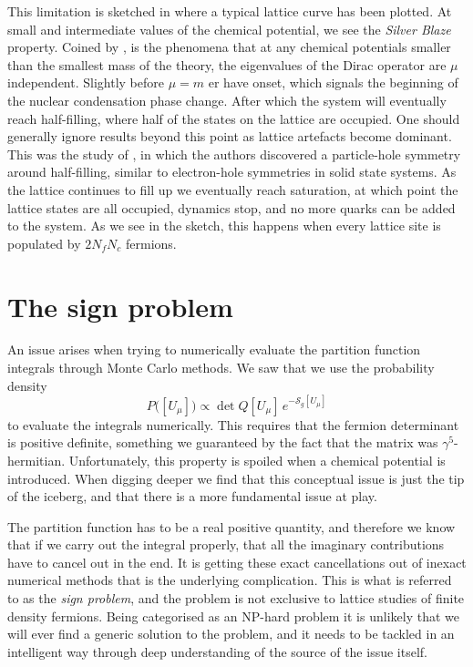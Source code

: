 This limitation is sketched in  where a typical
lattice curve has been plotted. At small and intermediate values of the chemical
potential, we see the \emph{Silver Blaze} property. Coined by
\cite{Cohen:2003kd}, is the phenomena that at any chemical potentials smaller
than the smallest mass of the theory, the eigenvalues of the Dirac operator are
$\mu$ independent. Slightly before $\mu = m$ er have onset, which signals the
beginning of the nuclear condensation phase change. After which the system will
eventually reach half-filling, where half of the states on the lattice are
occupied. One should generally ignore results beyond this point as lattice
artefacts become dominant. This was the study of \citep{Rindlisbacher:2015pea},
in which the authors discovered a particle-hole symmetry around half-filling,
similar to electron-hole symmetries in solid state systems. As the lattice
continues to fill up we eventually reach saturation, at which point the lattice
states are all occupied, dynamics stop, and no more quarks can be added to the
system. As we see in the sketch, this happens when every lattice site is
populated by $2 N_f N_c$ fermions.


\section{The sign problem} \label{sec:sign-problem}

An issue arises when trying to numerically evaluate the partition function
integrals through Monte Carlo methods. We saw that we use the probability
density
%
\begin{equation}
  P\big([U_{\mu}]\big) \propto \det Q [U_{\mu}] \, e^{-\mathcal{S}_g[U_{\mu}]}
\end{equation}
%
to evaluate the integrals numerically. This requires that the fermion
determinant is positive definite, something we guaranteed by the fact that the
matrix was $\gamma^5$-hermitian. Unfortunately, this property is spoiled when a
chemical potential is introduced. When digging deeper we find that this
conceptual issue is just the tip of the iceberg, and that there is a more
fundamental issue at play.

The partition function has to be a real positive quantity, and therefore we know
that if we carry out the integral properly, that all the imaginary contributions
have to cancel out in the end. It is getting these exact cancellations out of
inexact numerical methods that is the underlying complication. This is what is
referred to as the \emph{sign problem}, and the problem is not exclusive to
lattice studies of finite density fermions. Being categorised as an NP-hard
problem it is unlikely that we will ever find a generic solution to the problem,
and it needs to be tackled in an intelligent way through deep understanding of
the source of the issue itself.

